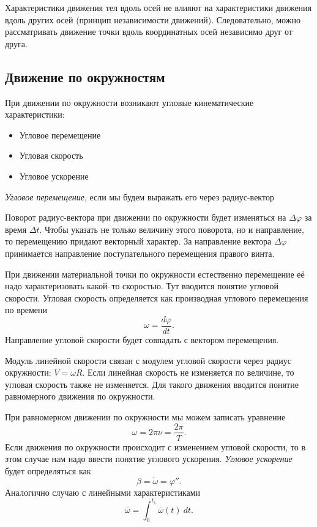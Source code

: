 Характеристики движения тел вдоль осей не влияют на характеристики движения
вдоль других осей (принцип независимости движений). Следовательно, можно
рассматривать движение точки вдоль координатных осей независимо друг от друга.

\subsection{Движение по окружностям}

При движении по окружности возникают угловые кинематические характеристики:
\begin{itemize}
  \item Угловое перемещение
  \item Угловая скорость
  \item Угловое ускорение
\end{itemize}

\emph{Угловое перемещение}, если мы будем выражать его через радиус-вектор

Поворот радиус-вектора при движении по окружности будет изменяться на \( \Delta
\varphi \) за время \( \Delta t \). Чтобы указать не только величину этого
поворота, но и направление, то перемещению придают векторный характер. За
направление вектора \( \Delta \varphi \) принимается направление
поступательного перемещения правого винта.

При движении материальной точки по окружности естественно перемещение её надо
характеризовать какой--то скоростью. Тут вводится понятие угловой скорости.
Угловая скорость определяется как производная углового перемещения по времени
\[ \omega = \frac{d \varphi}{d t} .\] Направление угловой скорости будет
совпадать с вектором перемещения.

Модуль линейной скорости связан с модулем угловой скорости через радиус
окружности: \( V = \omega R \). Если линейная скорость не изменяется
по величине, то
угловая скорость также не изменяется. Для такого движения вводится понятие
равномерного движения по окружности.

При равномерном движении по окружности мы можем записать уравнение \[
  \omega = 2 \pi \nu = \frac{2 \pi}{T}
.\] Если движения по окружности происходит с изменением угловой скорости, то
в этом случае нам надо ввести понятие углового ускорения. \emph{Угловое
ускорение} будет определяться как \[
  \beta = \dot{\omega} = \varphi''
.\] Аналогично случаю с линейными характеристиками \[
  \bar{\omega} = \int_{{0}}^{{t_1}} {\bar{\omega} (t)} \: d{t} {}
.\]


